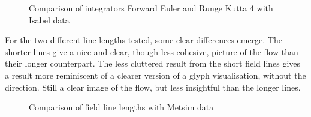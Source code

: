 \documentclass{article}
\begin{document}
\begin{figure}
\caption{Comparison of integrators Forward Euler and Runge Kutta 4 with Isabel data}
\end{figure}

For the two different line lengths tested, some clear differences emerge. The shorter
lines give a nice and clear, though less cohesive, picture of the flow than their
longer counterpart. The less cluttered result from the short field lines gives
a result more reminiscent of a clearer version of a glyph visualisation, without the
direction. Still a clear image of the flow, but less insightful than the longer lines.

\begin{figure}
\caption{Comparison of field line lengths with Metsim data}
\end{figure}
\end{document}
